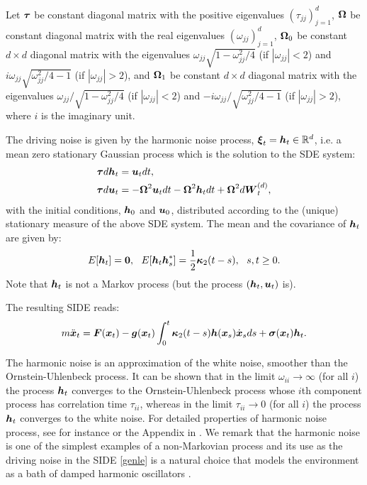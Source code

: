 \begin{itemize}
Let  $\boldsymbol{\tau}$ be  constant diagonal matrix with the positive eigenvalues $(\tau_{jj})_{j=1}^d$, $\boldsymbol{\Omega}$ be  constant diagonal matrix with the real eigenvalues $(\omega_{jj})_{j=1}^{d}$, $\boldsymbol{\Omega}_{0}$  be constant $d \times d$ diagonal matrix with the eigenvalues $\omega_{jj}\sqrt{1-\omega_{jj}^2/4}$ (if $|\omega_{jj}| < 2$) and  $i \omega_{jj}\sqrt{\omega_{jj}^2/4-1}$ (if $|\omega_{jj}|>2$), and $\boldsymbol{\Omega}_{1}$ be  constant $d \times d$ diagonal matrix with the eigenvalues $\omega_{jj}/\sqrt{1-\omega_{jj}^2/4}$ (if $|\omega_{jj}|<2$) and $-i\omega_{jj}/\sqrt{\omega_{jj}^2/4-1}$ (if $|\omega_{jj}|>2$), where $i$ is the imaginary unit.


The driving noise is given by the harmonic noise process, $\boldsymbol{\xi}_{t}=\boldsymbol{h}_{t} \in \mathbb{R}^d$, i.e. a mean zero stationary Gaussian process which is the solution to the SDE system: 
\begin{align}
\boldsymbol{\tau} d\boldsymbol{h}_{t} &=  \boldsymbol{u}_{t} dt, \label{unscaled_har1} \\ 
\boldsymbol{\tau} d\boldsymbol{u}_{t} &= -\boldsymbol{\Omega}^2 \boldsymbol{u}_{t} dt - \boldsymbol{\Omega}^2 \boldsymbol{h}_{t} dt + \boldsymbol{\Omega}^2  d\boldsymbol{W}^{(d)}_{t}, \label{unscaled_har2}
\end{align}
with the initial conditions, $\boldsymbol{h}_0$ and $\boldsymbol{u}_0$, distributed according to the (unique) stationary measure of the above SDE system. The mean and the covariance of $\boldsymbol{h}_{t}$ are given by: 
\begin{equation}
E[\vecc{h}_{t}] =  \vecc{0}, \ \ E[\vecc{h}_{t} \vecc{h}_{s}^{*}] = \frac{1}{2} \vecc{\kappa}_{2}(t-s),\ \  s, t \geq 0.\end{equation}
Note that $\boldsymbol{h}_t$ is not a Markov process (but the process $(\boldsymbol{h}_t, \boldsymbol{u}_t)$ is).

The resulting SIDE reads:
\begin{equation} \label{side3}
m \ddot{\boldsymbol{x}}_{t} =  \boldsymbol{F}(\boldsymbol{x}_{t}) - \boldsymbol{g}(\boldsymbol{x}_{t})\int_{0}^{t} \boldsymbol{\kappa}_{2}(t-s) \boldsymbol{h}(\boldsymbol{x}_{s}) \dot{\boldsymbol{x}}_{s} ds + \boldsymbol{\sigma}(\boldsymbol{x}_{t}) \boldsymbol{h}_{t}.
\end{equation}

The harmonic noise is  an approximation of the white noise, smoother than  the Ornstein-Uhlenbeck process. It can be shown that in the limit $\omega_{ii} \to \infty$ (for all $i$) the process $\boldsymbol{h}_{t}$ converges to the Ornstein-Uhlenbeck process whose $i$th component process has correlation time $\tau_{ii}$, whereas in the limit $\tau_{ii} \to 0$ (for all $i$) the process $\boldsymbol{h}_{t}$ converges to the white noise. For detailed properties of harmonic noise process, see for instance \cite{schimansky1990harmonic} or the Appendix in \cite{McDaniel14}. We remark that the harmonic noise is one of the simplest examples of a non-Markovian process and its use as the driving  noise in the SIDE \eqref{genle} is a natural choice that models the environment as a bath of damped harmonic oscillators \cite{hanggi1993can}. 
\end{itemize}

